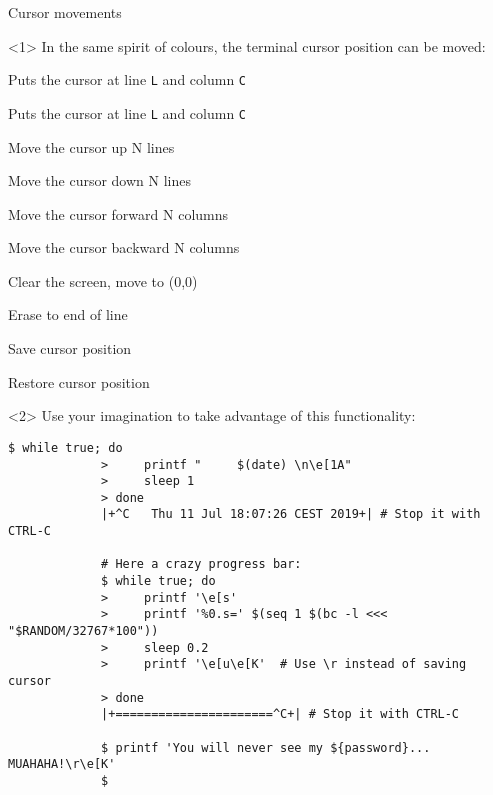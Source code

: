 \begin{frame}[fragile]{Cursor movements}
    \vspace{-1mm}
    \begin{onlyenv}<1>
        In the same spirit of colours, the terminal cursor position can be moved:
        \smallskip
        \begin{description}
            {\item[\texttt{<Esc>[<L>;<C>H}] Puts the cursor at line \texttt{L} and column \texttt{C}
            \item[\texttt{<Esc>[<L>;<C>f}] Puts the cursor at line \texttt{L} and column \texttt{C}
            \item[\texttt{<Esc>[<N>A}] Move the cursor up N lines
            \item[\texttt{<Esc>[<N>B}] Move the cursor down N lines
            \item[\texttt{<Esc>[<N>C}] Move the cursor forward N columns
            \item[\texttt{<Esc>[<N>D}] Move the cursor backward N columns
            \item[\texttt{<Esc>[2J}] Clear the screen, move to (0,0)
            \item[\texttt{<Esc>[K}] Erase to end of line
            \item[\texttt{<Esc>[s}] Save cursor position
            \item[\texttt{<Esc>[u}] Restore cursor position}
        \end{description}
    \end{onlyenv}
    \begin{onlyenv}<2>
        Use your imagination to take advantage of this functionality:
        \medskip
        \begin{lstlisting}[style=MyBash, numbers=none, xleftmargin=3mm, xrightmargin=3mm]
             $ while true; do
             >     printf "     $(date) \n\e[1A"
             >     sleep 1
             > done
             |+^C   Thu 11 Jul 18:07:26 CEST 2019+| # Stop it with CTRL-C

             # Here a crazy progress bar:
             $ while true; do
             >     printf '\e[s'
             >     printf '%0.s=' $(seq 1 $(bc -l <<< "$RANDOM/32767*100"))
             >     sleep 0.2
             >     printf '\e[u\e[K'  # Use \r instead of saving cursor
             > done
             |+======================^C+| # Stop it with CTRL-C

             $ printf 'You will never see my ${password}... MUAHAHA!\r\e[K'
             $
        \end{lstlisting}
    \end{onlyenv}
    \PrepareURLsymbol[PB]
\end{frame}


